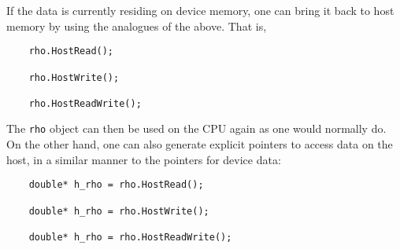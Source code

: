 \documentclass[a4paper,11pt]{article}
\begin{document}
If the data is currently residing on device memory, one can bring it back to host memory by using the analogues of the above. That is,
\begin{lstlisting}
    rho.HostRead();

    rho.HostWrite();

    rho.HostReadWrite();
\end{lstlisting}
 The \texttt{rho} object can then be used on the CPU again as one would normally do. On the other hand, one can also generate explicit pointers to access data on the host, in a similar manner to the pointers for device data:
\begin{lstlisting}
    double* h_rho = rho.HostRead();

    double* h_rho = rho.HostWrite();

    double* h_rho = rho.HostReadWrite();
\end{lstlisting}
\end{document}
